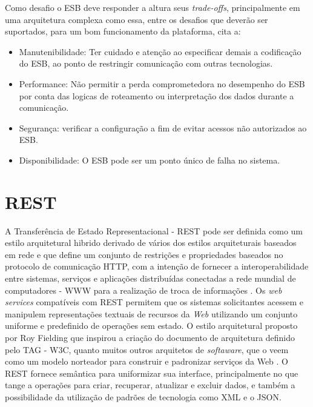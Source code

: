 Como desafio o \acrshort{ESB} deve responder a altura seus \textit{trade-offs},  principalmente em uma arquitetura complexa como essa, entre os desafios que deverão ser suportados, para um bom funcionamento da plataforma, \cite{bianco2011architecting} cita a:

\begin{itemize}

\item Manutenibilidade: Ter cuidado e atenção ao especificar demais a codificação do ESB, ao ponto de restringir comunicação com outras tecnologias. 
 	
\item Performance: Não permitir a perda comprometedora no desempenho do \acrshort{ESB} por conta das logicas de roteamento ou interpretação dos dados durante a comunicação.

\item Segurança: verificar a configuração a fim de evitar acessos não autorizados ao \acrshort{ESB}.

\item Disponibilidade: O \acrshort{ESB} pode ser um ponto único de falha no sistema.

\end{itemize}


\section{REST}

A Transferência de Estado Representacional - \acrshort{REST} pode ser definida como um estilo arquitetural hibrido derivado de vários dos estilos arquiteturais baseados em rede e que define um conjunto de restrições e propriedades baseados no protocolo de comunicação \acrshort{HTTP}, com a intenção de fornecer a interoperabilidade entre sistemas, serviços e aplicações distribuídas conectadas a rede mundial de computadores - \acrshort{WWW} para a realização de troca de informações \cite{fielding2000architectural}. Os \textit{web services} compatíveis com \acrshort{REST} permitem que os sistemas solicitantes acessem e manipulem representações textuais de recursos da \textit{Web} utilizando um conjunto uniforme e predefinido de operações sem estado. O estilo arquitetural proposto por Roy Fielding que inspirou a criação do documento de arquitetura definido pelo \acrshort{TAG} - \acrshort{W3C},  quanto muitos outros arquitetos de \textit{softaware}, que o veem como um modelo norteador para construir e padronizar serviços da Web \cite{booth2013web}. O \acrshort{REST} fornece semântica para uniformizar sua interface, principalmente no que tange a  operações para criar, recuperar, atualizar e excluir dados, e  também a possibilidade da utilização de padrões de tecnologia como \acrshort{XML} e o \acrshort{JSON}. 

